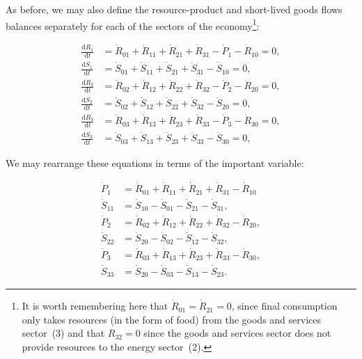 As before,
we may also define the resource-product
and short-lived goods flows balances separately
for each of the sectors of the economy\footnote{It
is worth remembering here that 
$\dot{R}_{01} = \dot{R}_{21} = 0$,
since final consumption only takes resources
(in the form of food) from the goods and services
sector~(3) and that $R_{32} = 0$ since
the goods and services sector does not provide
resources to the energy sector~(2).}:

\begin{align}
	\frac{\mathrm{d}R_{1}}{\mathrm{d}t} 	&
	= \dot{R}_{01}
	+ \dot{R}_{11}
	+ \dot{R}_{21}
	+ \dot{R}_{31}
	- \dot{P}_{1}
	- \dot{R}_{10}
	= 0,															\\
\label{eq:C_dS1}
	\frac{\mathrm{d}S_{1}}{\mathrm{d}t} 	&
	= \dot{S}_{01}
	+ \dot{S}_{11}
	+ \dot{S}_{21}
	+ \dot{S}_{31}
	- \dot{S}_{10}
	= 0,															\\
	\frac{\mathrm{d}R_{2}}{\mathrm{d}t} 	&
	= \dot{R}_{02}
	+ \dot{R}_{12}
	+ \dot{R}_{22}
	+ \dot{R}_{32}
	- \dot{P}_{2}
	- \dot{R}_{20}
	= 0,															\\
\label{eq:C_dS2}
	\frac{\mathrm{d}S_{2}}{\mathrm{d}t} 	&
	= \dot{S}_{02}
	+ \dot{S}_{12}
	+ \dot{S}_{22}
	+ \dot{S}_{32}
	- \dot{S}_{20}
	= 0,															\\
	\frac{\mathrm{d}R_{3}}{\mathrm{d}t} 	&
	= \dot{R}_{03}
	+ \dot{R}_{13}
	+ \dot{R}_{23}
	+ \dot{R}_{33}
	- \dot{P}_{3}
	- \dot{R}_{30}
	= 0,															\\
\label{eq:C_dS3}
	\frac{\mathrm{d}S_{3}}{\mathrm{d}t} 	&
	= \dot{S}_{03}
	+ \dot{S}_{13}
	+ \dot{S}_{23}
	+ \dot{S}_{33}
	- \dot{S}_{30}
	= 0,
\end{align}

We may rearrange these equations
in terms of the important variable:

\begin{align}
\label{eq:C_P1a}
	\dot{P}_{1}												&
	= \dot{R}_{01}
	+ \dot{R}_{11}
	+ \dot{R}_{21}
	+ \dot{R}_{31}
	- \dot{R}_{10}											\\
\label{eq:C_S11}
	\dot{S}_{11}											&
	= \dot{S}_{10}
	- \dot{S}_{01}
	- \dot{S}_{21}
	- \dot{S}_{31},										\\
\label{eq:C_P2a}
	\dot{P}_{2}												&
	= \dot{R}_{02}
	+ \dot{R}_{12}
	+ \dot{R}_{22}
	+ \dot{R}_{32}
	- \dot{R}_{20},										\\
\label{eq:C_S22}
	\dot{S}_{22}											&
	= \dot{S}_{20}
	- \dot{S}_{02} 
	- \dot{S}_{12}
	- \dot{S}_{32},										\\
\label{eq:C_P3a}
	\dot{P}_{3}												&
	= \dot{R}_{03}
	+ \dot{R}_{13}
	+ \dot{R}_{23}
	+ \dot{R}_{33}
	- \dot{R}_{30},										\\
\label{eq:C_S33}
	\dot{S}_{33}											&
	= \dot{S}_{20}
	- \dot{S}_{03}
	- \dot{S}_{13}
	- \dot{S}_{23}.	
\end{align}

